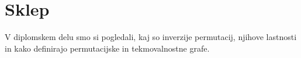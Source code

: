 \documentclass[a4paper, 12pt]{book}
\begin{document}




\chapter{Sklep}

V diplomskem delu smo si pogledali, kaj so inverzije permutacij, njihove lastnosti in kako definirajo permutacijske in tekmovalnostne grafe.
\end{document}
